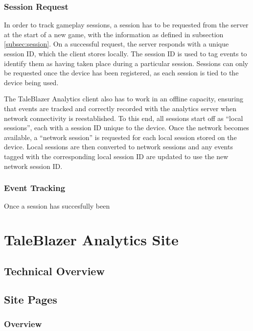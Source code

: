 \subsubsection{Session Request}

In order to track gameplay sessions, a session has to be requested from the server at the start of a new game, with the information as defined in subsection \ref{subsec:session}. On a successful request, the server responds with a unique session ID, which the client stores locally. The session ID is used to tag events to identify them as having taken place during a particular session. Sessions can only be requested once the device has been registered, as each session is tied to the device being used.

The TaleBlazer Analytics client also has to work in an offline capacity, ensuring that events are tracked and correctly recorded with the analytics server when network connectivity is reestablished. To this end, all sessions start off as ``local sessions'', each with a session ID unique to the device. Once the network becomes available, a ``network session'' is requested for each local session stored on the device. Local sessions are then converted to network sessions and any events tagged with the corresponding local session ID are updated to use the new network session ID. 

\subsubsection{Event Tracking}

Once a session has succesfully been








\section{TaleBlazer Analytics Site}

\subsection{Technical Overview}

\subsection{Site Pages}

\subsubsection{Overview}
